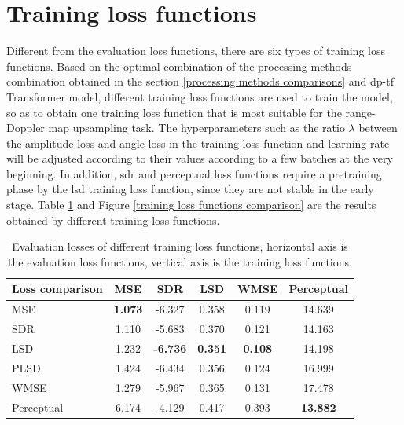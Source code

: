 \section{Training loss functions} \label{training loss functions evaluations}
Different from the evaluation loss functions, there are six types of training loss functions. Based on the optimal combination of the processing methods combination obtained in the section \ref{processing methods comparisons} and \gls{dp}-\gls{tf} Transformer model, different training loss functions are used to train the model, so as to obtain one training loss function that is most suitable for the range-Doppler map upsampling task. The hyperparameters such as the ratio $\lambda$ between the amplitude loss and angle loss in the training loss function and learning rate will be adjusted according to their values according to a few batches at the very beginning. In addition, \gls{sdr} and perceptual loss functions require a pretraining phase by the \gls{lsd} training loss function, since they are not stable in the early stage. Table \ref{Evaluation losses of the training loss functions comparison} and Figure \ref{training loss functions comparison} are the results obtained by different training loss functions.


\begin{table}
    \centering
    \caption{Evaluation losses of different training loss functions, horizontal axis is the evaluation loss functions, vertical axis is the training loss functions.}
    \label{Evaluation losses of the training loss functions comparison}
    \begin{tabular}{l|c|c|c|c|c}
        \hline
        Loss comparison & MSE & SDR & LSD & WMSE & Perceptual \\
        \hline
        MSE & \textbf{1.073} & -6.327 & 0.358 & 0.119 & 14.639 \\
        \hline
        SDR & 1.110 & -5.683 & 0.370 & 0.121 & 14.163 \\
        \hline
        LSD & 1.232 & \textbf{-6.736} & \textbf{0.351} & \textbf{0.108} & 14.198 \\
        \hline
        PLSD & 1.424 & -6.434 & 0.356 & 0.124 & 16.999 \\
        \hline
        WMSE & 1.279 & -5.967 & 0.365 & 0.131 & 17.478 \\
        \hline
        Perceptual & 6.174 & -4.129 & 0.417 & 0.393 & \textbf{13.882} \\
        \hline
    \end{tabular}
\end{table}

